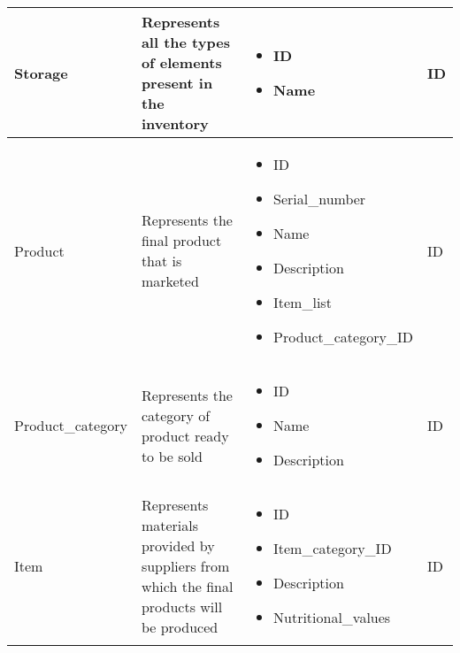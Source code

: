 \begin{longtable}{|p{}|p{} |p{}|p{} |}
    Storage & Represents all the types of elements present in the inventory &
        \begin{itemize}
            \vspace{-1em}
            \item ID
            \item Name
        \end{itemize}
    &  ID \\\hline

    Product & Represents the final product that is marketed &
    \begin{itemize}
        \vspace{-1em}
        \item ID
        \item Serial\_number
        \item Name
        \item Description
        \item Item\_list    %
        \item Product\_category\_ID
    \end{itemize}
    &  ID \\\hline

    Product\_category & Represents the category of product ready to be sold &
    \begin{itemize}
        \vspace{-1em}
        \item ID
        \item Name
        \item Description
    \end{itemize}
    &  ID \\\hline

    Item & Represents materials provided by suppliers from which the final products will be produced &
    \begin{itemize}
        \vspace{-1em}
        \item ID
        \item Item\_category\_ID
        \item Description
        \item Nutritional\_values   %
    \end{itemize}
    &  ID \\\hline


\end{longtable}
